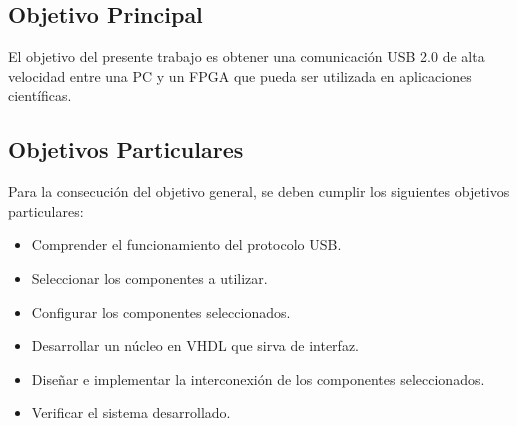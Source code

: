 \subsection{Objetivo Principal}
	El objetivo del presente trabajo es obtener una comunicación USB 2.0 de alta velocidad entre una PC y un FPGA que pueda ser utilizada en aplicaciones científicas.%
	
\subsection{Objetivos Particulares}
	Para la consecución del objetivo general, se deben cumplir los siguientes objetivos particulares:
	
	\begin{itemize}
		\item Comprender el funcionamiento del protocolo USB.
		\item Seleccionar los componentes a utilizar.
		\item Configurar los componentes seleccionados.
		\item Desarrollar un núcleo en VHDL que sirva de interfaz.
		\item Diseñar e implementar la interconexión de los componentes seleccionados.
		\item Verificar el sistema desarrollado.
	\end{itemize}